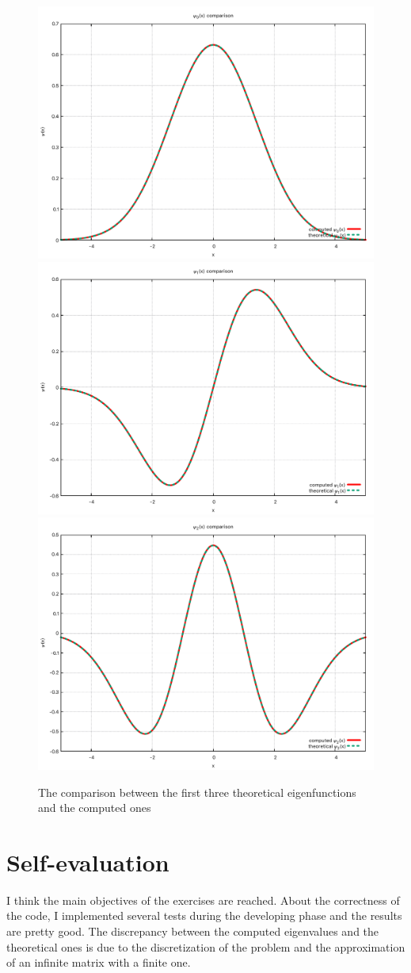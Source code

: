 \documentclass[prb,9pt,notitlepage]{revtex4-1}
\begin{document}
\begin{figure}[h]
    \includegraphics[width=.45\textwidth]{psi_0}\hfill
    \includegraphics[width=.45\textwidth]{psi_1}\hfill
    \includegraphics[width=.45\textwidth]{psi_2}
    \caption{The comparison between the first three theoretical eigenfunctions and the computed ones}\label{fig:foobar}
\end{figure}

\section{Self-evaluation}
I think the main objectives of the exercises are reached. About the correctness of the code, I implemented several tests during the developing phase and the results are pretty good. The discrepancy between the computed eigenvalues and the theoretical ones is due to the discretization of the problem and the approximation of an infinite matrix with a finite one.
\end{document}

